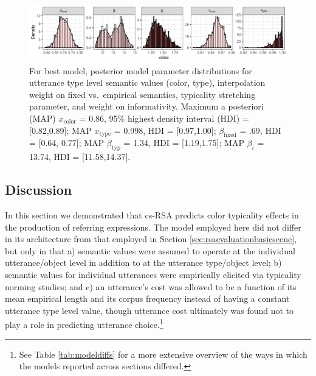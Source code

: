 \documentclass[11pt]{article}
\newcommand{\tableref}[1]{Table \ref{#1}}
\newcommand{\sectionref}[1]{Section \ref{#1}}
\begin{document}
\begin{figure}
\centering
\includegraphics[width=\textwidth]{pics/exp2-cost-none-sem-fixedplusempirical-paramposteriors}
\caption{For best model, posterior model parameter distributions for utterance type level semantic values (color, type), interpolation weight on fixed vs.~empirical semantics, typicality stretching parameter, and weight on informativity. Maximum a posteriori (MAP)  $x_{\textrm{color}}$ = 0.86, 95\% highest density interval (HDI) = [0.82,0.89]; MAP $x_{\textrm{type}}$ = 0.998, HDI = [0.97,1.00]; $\beta_{\textrm{fixed}}$ = .69, HDI = [0.64, 0.77]; MAP $\beta_{\textrm{typ}}$ = 1.34, HDI = [1.19,1.75]; MAP $\beta_i$ = 13.74, HDI = [11.58,14.37].}
\label{fig:typparamposteriors}
\end{figure}




\subsection{Discussion}

In this section we demonstrated that cs-RSA predicts color typicality effects in the production of referring expressions. The model employed here did not differ in its architecture from that employed in \sectionref{sec:rsaevaluationbasicscene}, but only in that a) semantic values were assumed to operate at the individual utterance/object level in addition to at the utterance type/object level; b) semantic values for individual utterances were empirically elicited via typicality norming studies; and c) an utterance's cost was allowed to be a function of its mean empirical length and its corpus frequency instead of having a constant utterance type level value, though utterance cost ultimately was found not to play a role in predicting utterance choice.\footnote{See \tableref{tab:modeldiffs} for a more extensive overview of the ways in which the models reported across sections differed.} 
\end{document}
